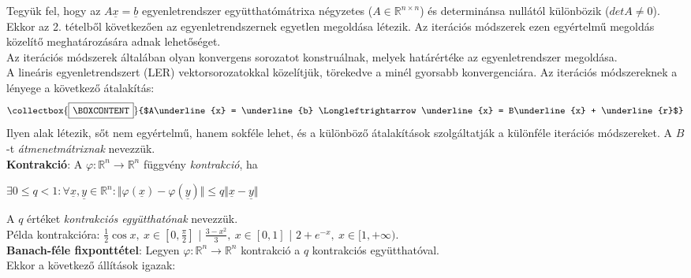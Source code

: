 \documentclass[tikz,12pt,margin=0px]{article}
\newcommand\ddfrac[2]{\frac{\displaystyle #1}{\displaystyle #2}}
\newcommand{\mybox}{%
    \collectbox{%
        \setlength{\fboxsep}{4pt}%
        \fbox{\BOXCONTENT}%
    }%
}
\begin{document}
    \noindent Tegyük fel, hogy az $A\underline{x}=\underline{b}$ egyenletrendszer együtthatómátrixa négyzetes ($A \in \mathbb{R}^{n \times n}$) és determinánsa nullától különbözik ($det A \neq 0$). Ekkor az 2. tételből következően az egyenletrendszernek egyetlen megoldása létezik. Az iterációs módszerek ezen egyértelmű megoldás közelítő meghatározására adnak lehetőséget.\\

    \noindent Az iterációs módszerek általában olyan konvergens sorozatot konstruálnak, melyek határértéke az egyenletrendszer megoldása.\\

	\noindent A lineáris egyenletrendszert (LER) vektorsorozatokkal közelítjük, törekedve a minél gyorsabb konvergenciára.
	Az iterációs módszereknek a lényege a következő átalakítás:
    \[
        \mybox{$A\underline{x} = \underline{b} \Longleftrightarrow \underline{x} = B\underline{x} + \underline{r}$}
    \]
    Ilyen alak létezik,	sőt nem egyértelmű,	hanem sokféle lehet, és a különböző átalakítások szolgáltatják a különféle iterációs módszereket. A $B$-t \emph{átmenetmátrixnak} nevezzük.\\

	\noindent \textbf{Kontrakció}: A $\varphi: \mathbb{R}^{n} \to \mathbb{R}^{n}$ függvény \emph{kontrakció}, ha
    \begin{center}
        $\exists 0 \leq q < 1 : \forall \underline{x}, \underline{y} \in \mathbb{R}^{n}: \Vert \varphi(\underline{x}) - \varphi(\underline{y}) \Vert \leq q \Vert \underline{x} - \underline{y} \Vert$
	\end{center}
	\noindent A $q$ értéket \emph{kontrakciós együtthatónak} nevezzük.\\

    \noindent Példa kontrakcióra: $\ddfrac{1}{2}\cos x,\ x \in [0,\ddfrac{\pi}{2}]$ \Big| $\ddfrac{3 - x^2}{3},\ x \in [0,1]$ \Big| $2 + e^{-x},\ x \in [1, +\infty)$.\\

	\noindent \textbf{Banach-féle fixponttétel}: Legyen $\varphi: \mathbb{R}^{n} \to \mathbb{R}^{n}$ kontrakció a $q$
	kontrakciós együtthatóval.\\

    \noindent Ekkor a következő állítások igazak:
	
\end{document}
